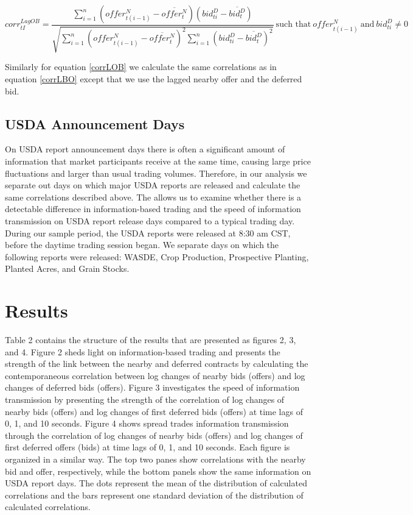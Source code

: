 \documentclass[]{elsarticle} %
\begin{document}
\begin{equation} \label{corrLOB}
corr^{LagOB}_{tI} = \frac{\sum\limits_{i=1}^{n} \left(offer_{t(i-1)}^N - \overline{offer_t^N}\right) \left(bid_{ti}^D - \overline{bid_t^D}\right)}{\sqrt{\sum\limits_{i=1}^{n} \left(offer_{t(i-1)}^N - \overline{offer_t^N}\right)^2 \sum\limits_{i=1}^{n}\left(bid_{ti}^D - \overline{bid_t^D}\right)^2}} \: \textrm{such that} \: {offer_{t(i-1)}^N \: \textrm{and} \: bid_{ti}^D} \neq 0
\end{equation}

Similarly for equation \ref{corrLOB} we calculate the same correlations
as in equation \ref{corrLBO} except that we use the lagged nearby offer
and the deferred bid.

\subsection{USDA Announcement Days}\label{usda-announcement-days}

On USDA report announcement days there is often a significant amount of
information that market participants receive at the same time, causing
large price fluctuations and larger than usual trading volumes.
Therefore, in our analysis we separate out days on which major USDA
reports are released and calculate the same correlations described
above. The allows us to examine whether there is a detectable difference
in information-based trading and the speed of information transmission
on USDA report release days compared to a typical trading day. During
our sample period, the USDA reports were released at 8:30 am CST, before
the daytime trading session began. We separate days on which the
following reports were released: WASDE, Crop Production, Prospective
Planting, Planted Acres, and Grain Stocks.

\section{Results}\label{results}

Table 2 contains the structure of the results that are presented as
figures 2, 3, and 4. Figure 2 sheds light on information-based trading
and presents the strength of the link between the nearby and deferred
contracts by calculating the contemporaneous correlation between log
changes of nearby bids (offers) and log changes of deferred bids
(offers). Figure 3 investigates the speed of information transmission by
presenting the strength of the correlation of log changes of nearby bids
(offers) and log changes of first deferred bids (offers) at time lags of
0, 1, and 10 seconds. Figure 4 shows spread trades information
transmission through the correlation of log changes of nearby bids
(offers) and log changes of first deferred offers (bids) at time lags of
0, 1, and 10 seconds. Each figure is organized in a similar way. The top
two panes show correlations with the nearby bid and offer, respectively,
while the bottom panels show the same information on USDA report days.
The dots represent the mean of the distribution of calculated
correlations and the bars represent one standard deviation of the
distribution of calculated correlations.
\end{document}
